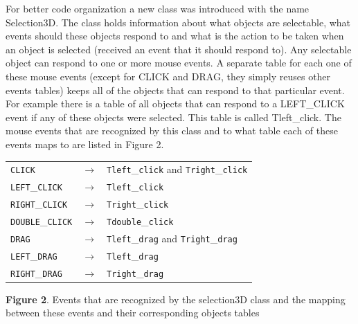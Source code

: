 \documentclass[letterpaper]{article}
\begin{document}
For better code organization a new class was introduced with the name
Selection3D. The class holds information about what objects are
selectable, what events should these objects respond to and what is
the action to be taken when an object is selected (received an event
that it should respond to). Any selectable object can respond to one
or more mouse events. A separate table for each one of these mouse
events (except for \textsf{CLICK} and \textsf{DRAG}, they simply
reuses other events tables) keeps all of the objects that can respond
to that particular event. For example there is a table of all objects
that can respond to a \textsf{LEFT}\textsf{\_}\textsf{CLICK} event if
any of these objects were selected. This table is called
\textsf{Tleft}\textsf{\_}\textsf{click}. The mouse events that are
recognized by this class and to what table each of these events maps
to are listed in Figure 2.

\begin{center}
\begin{minipage}{5.1in}

\begin{tabular}{|l l l|}\hline
\texttt{CLICK} & $\rightarrow$ & \texttt{Tleft}\_\texttt{click} and
					\texttt{Tright}\_\texttt{click} \\
\texttt{LEFT}\_\texttt{CLICK} &  $\rightarrow$ &  \texttt{Tleft}\_\texttt{click}\\
\texttt{RIGHT}\_\texttt{CLICK} &  $\rightarrow$ &  \texttt{Tright}\_\texttt{click}\\
\texttt{DOUBLE}\_\texttt{CLICK} &  $\rightarrow$ &  \texttt{Tdouble}\_\texttt{click}\\
\texttt{DRAG} &  $\rightarrow$ &  \texttt{Tleft}\_\texttt{drag} and \texttt{Tright}\_\texttt{drag}\\
\texttt{LEFT}\_\texttt{DRAG} &  $\rightarrow$ & \texttt{Tleft}\_\texttt{drag}\\
\texttt{RIGHT}\_\texttt{DRAG} &  $\rightarrow$ & \texttt{Tright}\_\texttt{drag}\\
\hline
\end{tabular}

\vspace{0.16in}

{
\textbf{Figure 2}. Events that are recognized by the selection3D class
and the mapping between these events and their corresponding objects tables}
\end{minipage}
\end{center}
\end{document}
